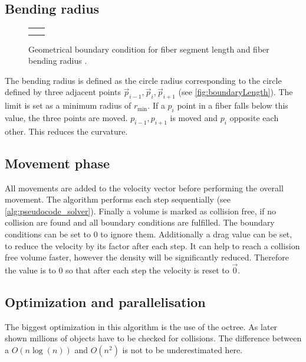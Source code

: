 \subsection{Bending radius}
%
\begin{figure}[!t]
    \centering
    \setlength{\tikzheight}{.42\textwidth}
    \setlength{\tabcolsep}{0pt}
    \begin{tabular}{C{0.5\textwidth}C{0.5\textwidth}}
     &
     \\
     &
    \end{tabular}
	\caption{Geometrical boundary condition for fiber segment length \segLength{} and fiber bending radius \segRadius{}.}
	\label{fig:modelCircle}
\end{figure}
%
The bending radius is defined as the circle radius corresponding to the circle defined by three adjacent points $\vec{p}_{i-1}, \vec{p}_{i}, \vec{p}_{i+1}$ (see \cref{fig:boundaryLength}).
The limit is set as a minimum radius of $r_{\min}$.
If a $p_{i}$ point in a fiber falls below this value, the three points are moved.
$p_{i-1},p_{i+1}$ is moved \dummy{} and $p_{i}$ opposite each other.
This reduces the curvature.
%
\subsection{Movement phase}
All movements are added to the velocity vector before performing the overall movement.
The algorithm performs each step sequentially (see \cref{alg:pseudocode_solver}).
%
Finally a volume is marked as collision free, if no collision are found and all boundary conditions are fulfilled.
The boundary conditions can be set to 0 to ignore them.
Additionally a drag value can be set, to reduce the velocity by its factor after each step.
It can help to reach a collision free volume faster, however the density will be significantly reduced.
Therefore the value is to 0 so that after each step the velocity is reset to $\vec{0}$.
%
\subsection{Optimization and parallelisation}\label{sec:modelOpt}
%
%
The biggest optimization in this algorithm is the use of the octree.
As later shown millions \dummy[ueberpruefen]{} of objects have to be checked for collisions.
The difference between a $O(n\log(n))$ and $O(n^2)$ is not to be underestimated here.
%
